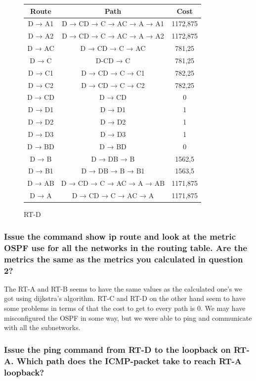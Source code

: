 \documentclass[a4paper, titlepage,12pt]{article}
\begin{document}
		\begin{figure}[H]
			\begin{center}
				\begin{tabular}{|c|c|c|}
					\hline
	Route & Path & Cost \\
	\hline
	D → A1 & D → CD → C → AC → A → A1 & 1172,875 \\
	\hline
	D → A2 & D → CD → C → AC → A → A2 & 1172,875 \\
	\hline
	D → AC & D → CD → C → AC & 781,25 \\
	\hline
	D → C & D-CD → C & 781,25 \\
	\hline
	D → C1 & D → CD → C → C1 & 782,25 \\
	\hline
	D → C2 & D → CD → C → C2 & 782,25 \\
	\hline
	D → CD & D → CD & 0 \\
	\hline
	D → D1 & D → D1 & 1 \\
	\hline
	D → D2 & D → D2 & 1 \\
	\hline
	D → D3 & D → D3 & 1 \\
	\hline
	D → BD & D → BD & 0 \\
	\hline
	D → B & D → DB → B & 1562,5 \\
	\hline
	D → B1 & D → DB → B → B1 & 1563,5 \\
	\hline
	D → AB & D → CD → C → AC → A → AB & 1171,875 \\
	\hline
	D → A & D → CD → C → AC → A & 1171,875 \\
	\hline
				\end{tabular}
				\caption{RT-D}
			\end{center}
		\end{figure}

		\subsubsection{Issue the command show ip route and look at the metric OSPF use for all the networks in the routing table. Are the metrics the same as the metrics you calculated in question 2?}

		The RT-A and RT-B seems to have the same values as the calculated one’s we got using dijkstra's algorithm. RT-C and RT-D on the other hand seem to have some problems in terms  of that the cost to get to every path is 0. We may have misconfigured the OSPF in some way, but we were able to ping and communicate with all the subnetworks.

		\subsubsection{Issue the ping command from RT-D to the loopback on RT-A. Which path does the ICMP-packet take to reach RT-A loopback?}
\end{document}
